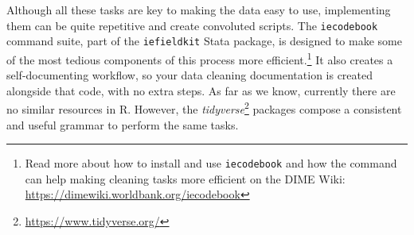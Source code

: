 \documentclass[
]{book}
\begin{document}
Although all these tasks are key to making the data easy to use,
implementing them can be quite repetitive and create convoluted scripts.
The \texttt{iecodebook} command suite, part of the \texttt{iefieldkit} Stata package,
is designed to make some of the most tedious components of this process more efficient.\footnote{Read more about how to install and use \texttt{iecodebook} and
  how the command can help making cleaning tasks more efficient
  on the DIME Wiki:
  \url{https://dimewiki.worldbank.org/iecodebook}}
It also creates a self-documenting workflow,
so your data cleaning documentation is created alongside that code,
with no extra steps.
As far as we know, currently there are no similar resources in R.
However, the \emph{tidyverse}\footnote{\url{https://www.tidyverse.org/}} packages
compose a consistent and useful grammar to perform the same tasks.
\end{document}
